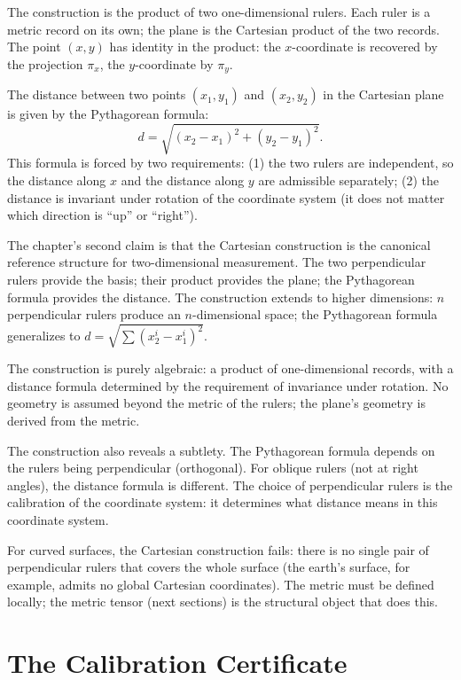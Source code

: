 The construction is the product of two one-dimensional rulers. Each
ruler is a metric record on its own; the plane is the Cartesian
product of the two records. The point $(x, y)$ has identity in
the product: the $x$-coordinate is recovered by the projection
$\pi_x$, the $y$-coordinate by $\pi_y$.

The distance between two points $(x_1, y_1)$ and $(x_2, y_2)$ in
the Cartesian plane is given by the Pythagorean formula:
\[
d = \sqrt{(x_2 - x_1)^2 + (y_2 - y_1)^2}.
\]
This formula is forced by two requirements: (1) the two rulers
are independent, so the distance along $x$ and the distance along
$y$ are admissible separately; (2) the distance is invariant under
rotation of the coordinate system (it does not matter which
direction is ``up'' or ``right'').

The chapter's second claim is that the Cartesian construction is
the canonical reference structure for two-dimensional measurement.
The two perpendicular rulers provide the basis; their product
provides the plane; the Pythagorean formula provides the
distance. The construction extends to higher dimensions: $n$
perpendicular rulers produce an $n$-dimensional space; the
Pythagorean formula generalizes to $d = \sqrt{\sum (x_2^i -
x_1^i)^2}$.

The construction is purely algebraic: a product of one-dimensional
records, with a distance formula determined by the requirement of
invariance under rotation. No geometry is assumed beyond the
metric of the rulers; the plane's geometry is derived from the
metric.

The construction also reveals a subtlety. The Pythagorean formula
depends on the rulers being perpendicular (orthogonal). For
oblique rulers (not at right angles), the distance formula is
different. The choice of perpendicular rulers is the calibration
of the coordinate system: it determines what distance means in
this coordinate system.

For curved surfaces, the Cartesian construction fails: there is no
single pair of perpendicular rulers that covers the whole surface
(the earth's surface, for example, admits no global Cartesian
coordinates). The metric must be defined locally; the metric
tensor (next sections) is the structural object that does this.

\section{The Calibration Certificate}
\label{se:the-calibration-certificate}

